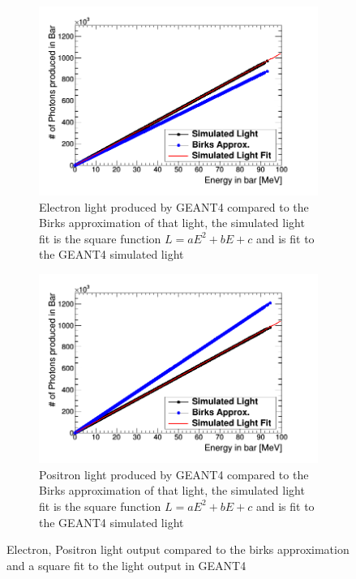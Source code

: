 \begin{figure}[!h]
\centering
\begin{subfigure}{.5\textwidth}
  \centering
  \includegraphics[width=\linewidth]{light_of_electrons0-100mev.png}
  \captionsetup{width=.9\linewidth}
  \caption{Electron light produced by GEANT4 compared to the Birks approximation of that light, the simulated light fit is the square function $L = aE^2 + bE+ c$ and is fit to the GEANT4 simulated light}
  \label{subFig:electron_light}
\end{subfigure}%
\begin{subfigure}{.5\textwidth}
  \centering
  \includegraphics[width=\linewidth]{light_of_positrons0-100mev.png}
  \captionsetup{width=.9\linewidth}
  \caption{Positron light produced by GEANT4 compared to the Birks approximation of that light, the simulated light fit is the square function $L = aE^2 + bE+ c$ and is fit to the GEANT4 simulated light}
  \label{subFig:positron_light}
\end{subfigure}
\caption{Electron, Positron light output compared to the birks approximation and a square fit to the light output in GEANT4}
\label{fig:electron_positron_light}
\end{figure}
